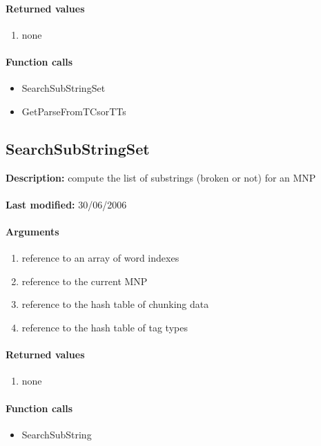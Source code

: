 \paragraph{Returned values}
\begin{enumerate}
\item none
\end{enumerate}

\paragraph{Function calls}
\begin{itemize}
\item SearchSubStringSet
\item GetParseFromTCsorTTs
\end{itemize}

\subsection{SearchSubStringSet}
\textbf{Description:} compute the list of substrings (broken or not) for an MNP\\
\\\textbf{Last modified:} 30/06/2006

\paragraph{Arguments}
\begin{enumerate}
\item reference to an array of word indexes
\item reference to the current MNP
\item reference to the hash table of chunking data
\item reference to the hash table of tag types
\end{enumerate}

\paragraph{Returned values}
\begin{enumerate}
\item none
\end{enumerate}

\paragraph{Function calls}
\begin{itemize}
\item SearchSubString
\end{itemize}

